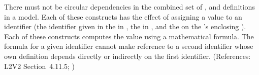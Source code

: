 There must not be circular dependencies in the combined set of
\InitialAssignment, \AssignmentRule and \KineticLaw definitions in a model.
Each of these constructs has the effect of assigning a value to an
identifier (\ie the identifier given in the   in
\InitialAssignment, the   in \AssignmentRule, and the
  on the \KineticLaw's enclosing \Reaction).  Each of these
constructs computes the value using a mathematical formula.  The formula
for a given identifier cannot make reference to a second identifier whose
own definition depends directly or indirectly on the first identifier.
(References: L2V2 Section~4.11.5; )
